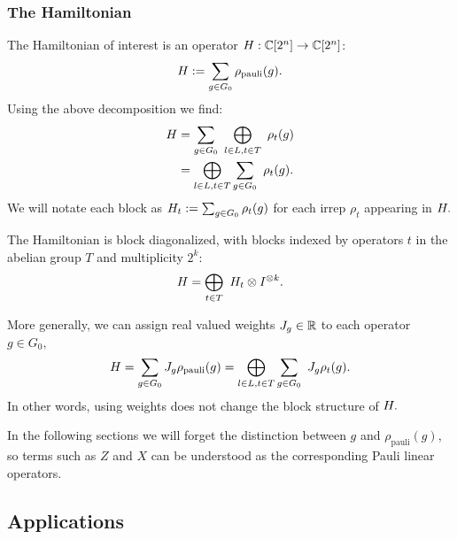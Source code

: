 \subsubsection{The Hamiltonian}

The Hamiltonian of interest is 
an operator $H:\mathbb{C}[2^n]\to\mathbb{C}[2^n]$:
$$ H := \sum_{g\in G_0} \rho_{\mathrm{pauli}}(g).$$
Using the above decomposition we find:
\begin{align*}
    H &= \sum_{g\in G_0}\ \bigoplus_{l\in L, t\in T}\ \rho_t(g)\\
         &= \bigoplus_{l\in L, t\in T} \sum_{g\in G_0}\ \rho_t(g).
\end{align*}
We will notate each block as
$H_t := \sum_{g\in G_0}\rho_t(g)$
for each irrep $\rho_t$ appearing in $H.$
\begin{framed}

The Hamiltonian is block diagonalized, with blocks indexed by operators $t$ in
the abelian group $T$ and multiplicity $2^k:$
$$
    H =  \bigoplus_{t\in T}\ H_t \otimes I^{\otimes k}.
$$
\end{framed}

More generally, we can assign real valued weights
$J_g\in\mathbb{R}$
to each operator $g\in G_0,$
\begin{align*}
    H = \sum_{g\in G_0} J_g \rho_{\mathrm{pauli}}(g)
            = \bigoplus_{l\in L, t\in T} \sum_{g\in G_0}\ J_g \rho_t(g).
\end{align*}
In other words, using weights does not change the block structure of $H.$

In the following sections we will forget the distinction 
between $g$ and $\rho_{\mathrm{pauli}}(g)$,
so terms such as $Z$ and $X$ can be understood
as the corresponding Pauli linear operators.

%
%

\subsection{Applications}

